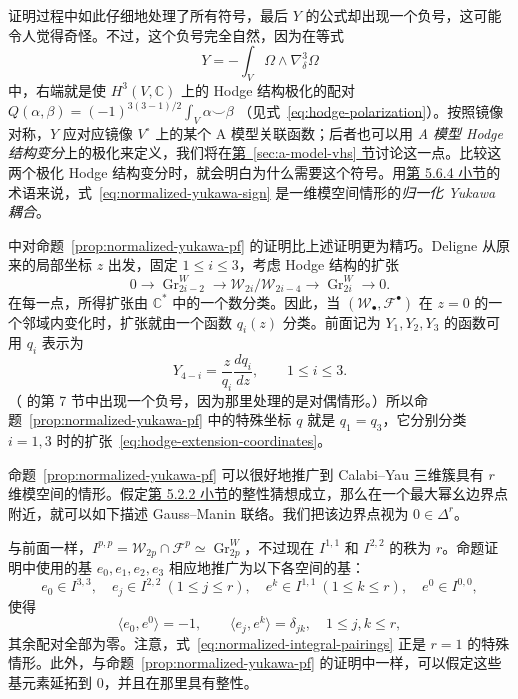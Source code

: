 证明过程中如此仔细地处理了所有符号，最后 $Y$ 的公式却出现一个负号，这可能令人觉得奇怪。不过，这个负号完全自然，因为在等式
\begin{equation}\label{eq:normalized-yukawa-sign}
Y=-\int_V\Omega\wedge\nabla_\delta^3\Omega
\end{equation}
中，右端就是使 $H^3(V,\mathbb C)$ 上的 Hodge 结构极化的配对
$Q(\alpha,\beta)=(-1)^{3(3-1)/2}\int_V\alpha\smile\beta$
（见式~\eqref{eq:hodge-polarization}）。按照镜像对称，$Y$ 应对应镜像 $V^\circ$ 上的某个 A 模型关联函数；后者也可以用 \emph{A 模型 Hodge 结构变分}上的极化来定义，我们将在\hyperref[sec:a-model-vhs]{第~\ref*{sec:a-model-vhs} 节}讨论这一点。比较这两个极化 Hodge 结构变分时，就会明白为什么需要这个符号。用\hyperref[subsec:normalized-yukawa-mirror]{第 5.6.4 小节}的术语来说，式~\eqref{eq:normalized-yukawa-sign} 是一维模空间情形的\emph{归一化 Yukawa 耦合}。

 中对命题~\ref{prop:normalized-yukawa-pf} 的证明比上述证明更为精巧。Deligne 从原来的局部坐标 $z$ 出发，固定 $1\leq i\leq3$，考虑 Hodge 结构的扩张
\begin{equation}\label{eq:hodge-extension-coordinates}
0\longrightarrow\operatorname{Gr}_{2i-2}^W
\longrightarrow\mathcal W_{2i}/\mathcal W_{2i-4}
\longrightarrow\operatorname{Gr}_{2i}^W\longrightarrow0.
\end{equation}
在每一点，所得扩张由 $\mathbb C^*$ 中的一个数分类。因此，当 $(\mathcal W_\bullet,\mathcal F^\bullet)$ 在 $z=0$ 的一个邻域内变化时，扩张就由一个函数 $q_i(z)$ 分类。前面记为 $Y_1,Y_2,Y_3$ 的函数可用 $q_i$ 表示为
\[
Y_{4-i}=\frac{z}{q_i}\frac{dq_i}{dz},\qquad1\leq i\leq3.
\]
（ 的第 7 节中出现一个负号，因为那里处理的是对偶情形。）所以命题~\ref{prop:normalized-yukawa-pf} 中的特殊坐标 $q$ 就是 $q_1=q_3$，它分别分类 $i=1,3$ 时的扩张~\eqref{eq:hodge-extension-coordinates}。

命题~\ref{prop:normalized-yukawa-pf} 可以很好地推广到 Calabi--Yau 三维簇具有 $r$ 维模空间的情形。假定\hyperref[subsec:higher-dimensional-mum]{第 5.2.2 小节}的整性猜想成立，那么在一个最大幂幺边界点附近，就可以如下描述 Gauss--Manin 联络。我们把该边界点视为 $0\in\Delta^r$。

与前面一样，$I^{p,p}=\mathcal W_{2p}\cap\mathcal F^p\simeq\operatorname{Gr}_{2p}^W$，不过现在 $I^{1,1}$ 和 $I^{2,2}$ 的秩为 $r$。命题证明中使用的基 $e_0,e_1,e_2,e_3$ 相应地推广为以下各空间的基：
\[
e_0\in I^{3,3},\quad e_j\in I^{2,2}\ (1\leq j\leq r),\quad
 e^k\in I^{1,1}\ (1\leq k\leq r),\quad e^0\in I^{0,0},
\]
使得
\begin{equation}\label{eq:multimoduli-integral-pairings}
\langle e_0,e^0\rangle=-1,\qquad
\langle e_j,e^k\rangle=\delta_{jk},\quad1\leq j,k\leq r,
\end{equation}
其余配对全部为零。注意，式~\eqref{eq:normalized-integral-pairings} 正是 $r=1$ 的特殊情形。此外，与命题~\ref{prop:normalized-yukawa-pf} 的证明中一样，可以假定这些基元素延拓到 $0$，并且在那里具有整性。

